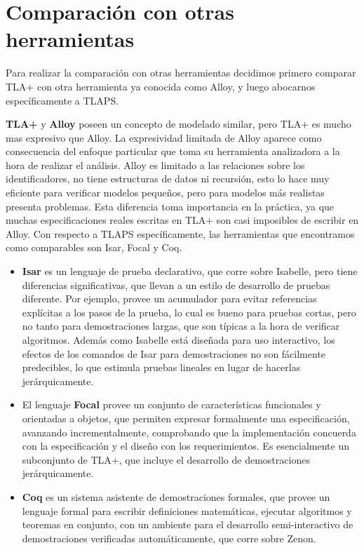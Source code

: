\documentclass[spanish]{llncs}
\begin{document}
\section{Comparación con otras herramientas}
Para realizar la comparación con otras herramientas decidimos primero comparar TLA+ con otra herramienta ya conocida como Alloy,
y luego abocarnos específicamente a TLAPS.

\textbf{TLA+} y \textbf{Alloy} poseen un concepto de modelado similar, pero TLA+ es mucho mas expresivo que Alloy. La expresividad limitada de Alloy aparece como consecuencia del enfoque particular que toma su herramienta analizadora a la hora de realizar el análisis. Alloy es limitado a las relaciones sobre los identificadores, no tiene estructuras de datos ni recursión, esto lo hace muy eficiente para verificar modelos pequeños, pero para modelos más realistas presenta problemas. 
Esta diferencia toma importancia en la práctica, ya que muchas especificaciones reales escritas en TLA+ son 
casi imposibles de escribir en Alloy.
Con respecto a TLAPS específicamente, las herramientas que encontramos como comparables son Isar, Focal y Coq.
    \begin{itemize}
      \item 
      \textbf{Isar} es un lenguaje de prueba declarativo, que corre sobre Isabelle, pero tiene diferencias significativas, que llevan a un estilo de desarrollo de pruebas diferente. Por ejemplo, provee un acumulador para evitar referencias explícitas a los pasos de la prueba, lo cual es bueno para pruebas cortas, pero no tanto para demostraciones largas, que son típicas a la hora de verificar algoritmos. Además como Isabelle está diseñada para uso interactivo, los efectos de los comandos de Isar para demostraciones no son fácilmente 
      predecibles, lo que estimula pruebas lineales en lugar de hacerlas jerárquicamente. 

      \item
      El lenguaje \textbf{Focal} provee un conjunto de características funcionales y orientadas a objetos, que permiten expresar formalmente una especificación, avanzando incrementalmente, comprobando que la implementación concuerda con la especificación y el diseño con los requerimientos. Es esencialmente un subconjunto de TLA+, que incluye el desarrollo de demostraciones jerárquicamente.

      \item
      \textbf{Coq} es un sistema asistente de demostraciones formales, que provee un lenguaje formal para escribir definiciones matemáticas, ejecutar algoritmos y teoremas en conjunto, con un ambiente para el desarrollo semi-interactivo de demostraciones verificadas automáticamente, que corre sobre Zenon.

    \end{itemize}
  
\end{document}
